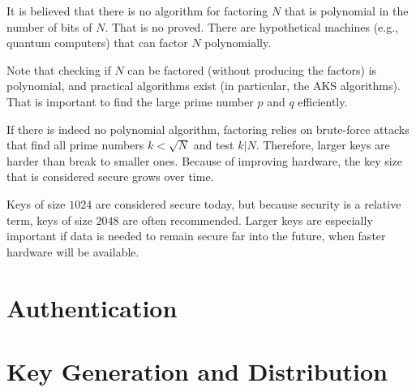 It is believed that there is no algorithm for factoring $N$ that is polynomial in the number of bits of $N$.
That is no proved.
There are hypothetical machines (e.g., quantum computers) that can factor $N$ polynomially.

Note that checking if $N$ can be factored (without producing the factors) is polynomial, and practical algorithms exist (in particular, the AKS algorithms).
That is important to find the large prime number $p$ and $q$ efficiently.
\medskip

If there is indeed no polynomial algorithm, factoring relies on brute-force attacks that find all prime numbers $k<\sqrt{N}$ and test $k|N$.
Therefore, larger keys are harder than break to smaller ones.
Because of improving hardware, the key size that is considered secure grows over time.

Keys of size $1024$ are considered secure today, but because security is a relative term, keys of size $2048$ are often recommended.
Larger keys are especially important if data is needed to remain secure far into the future, when faster hardware will be available.

\section{Authentication}

\section{Key Generation and Distribution}

